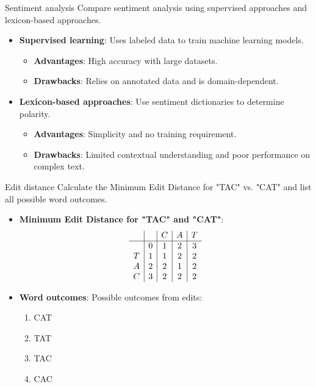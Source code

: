 \documentclass{article}
\begin{document}
\begin{exercise}{Sentiment analysis}
  Compare sentiment analysis using supervised approaches and lexicon-based approaches.

  \begin{solution}
    \begin{itemize}
        \item \textbf{Supervised learning}: Uses labeled data to train machine learning models.
        \begin{itemize}
            \item \textbf{Advantages}: High accuracy with large datasets.
            \item \textbf{Drawbacks}: Relies on annotated data and is domain-dependent.
        \end{itemize}
        \item \textbf{Lexicon-based approaches}: Use sentiment dictionaries to determine polarity.
        \begin{itemize}
            \item \textbf{Advantages}: Simplicity and no training requirement.
            \item \textbf{Drawbacks}: Limited contextual understanding and poor performance on complex text.
        \end{itemize}
    \end{itemize}
  \end{solution}
\end{exercise}

\begin{exercise}{Edit distance}
  Calculate the Minimum Edit Distance for "TAC" vs. "CAT" and list all possible word outcomes.

  \begin{solution}
    \begin{itemize}
        \item \textbf{Minimum Edit Distance for "TAC" and "CAT"}:
        \[
        \begin{array}{c|c|c|c|c}
            &  & C & A & T \\
            \hline
            & 0 & 1 & 2 & 3 \\
            T & 1 & 1 & 2 & 2 \\
            A & 2 & 2 & 1 & 2 \\
            C & 3 & 2 & 2 & 2 \\
        \end{array}
        \]
        \item \textbf{Word outcomes}: Possible outcomes from edits:
        \begin{enumerate}
            \item CAT
            \item TAT
            \item TAC
            \item CAC
        \end{enumerate}
    \end{itemize}
  \end{solution}
\end{exercise}
\end{document}
